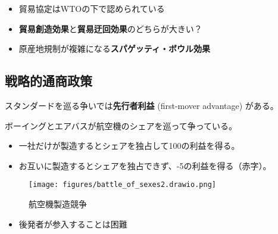 \documentclass[
  xelatex,
  ja=standard]{bxjsarticle}
\providecommand{\tightlist}{%
  \setlength{\itemsep}{0pt}\setlength{\parskip}{0pt}}\usepackage{longtable,booktabs,array}
\begin{document}
\begin{itemize}
\tightlist
\item
  貿易協定はWTOの下で認められている
\item
  \textbf{貿易創造効果}と\textbf{貿易迂回効果}のどちらが大きい？
\item
  原産地規制が複雑になる\textbf{スパゲッティ・ボウル効果}
\end{itemize}

\hypertarget{ux6226ux7565ux7684ux901aux5546ux653fux7b56}{%
\subsection{戦略的通商政策}\label{ux6226ux7565ux7684ux901aux5546ux653fux7b56}}

スタンダードを巡る争いでは\textbf{先行者利益} (first-mover advantage)
がある。

\begin{tcolorbox}[enhanced jigsaw, toprule=.15mm, leftrule=.75mm, coltitle=black, opacityback=0, colback=white, title=\textcolor{quarto-callout-tip-color}{\faLightbulb}\hspace{0.5em}{航空機製造競争}, rightrule=.15mm, bottomrule=.15mm, colbacktitle=quarto-callout-tip-color!10!white, opacitybacktitle=0.6, titlerule=0mm, colframe=quarto-callout-tip-color-frame, bottomtitle=1mm, toptitle=1mm, arc=.35mm, left=2mm, breakable]

ボーイングとエアバスが航空機のシェアを巡って争っている。

\begin{itemize}
\tightlist
\item
  一社だけが製造するとシェアを独占して100の利益を得る。
\item
  お互いに製造するとシェアを独占できず、-5の利益を得る（赤字）。
\end{itemize}

\end{tcolorbox}

\begin{figure}[htpb]

{\centering \texttt{[image: figures/battle\_of\_sexes2.drawio.png]}

}

\caption{航空機製造競争}

\end{figure}

\begin{itemize}
\tightlist
\item
  後発者が参入することは困難
\end{itemize}
\end{document}
